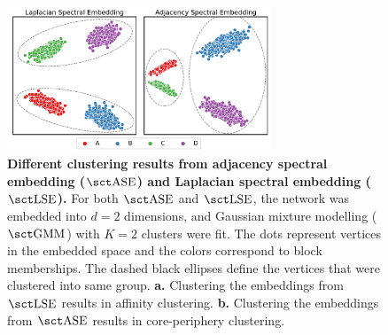 \begin{figure}
    \centering
    \includegraphics[width=0.7\textwidth]{figures/dnd/two_truths}
    \caption{\textbf{Different clustering results from adjacency spectral embedding ($\ase$) and Laplacian spectral embedding ($\lse$).} For both $\ase$ and $\lse$, the network was embedded into $d=2$ dimensions, and Gaussian mixture modelling ($\gmm$) with $K=2$ clusters were fit. The dots represent vertices in the embedded space and the colors correspond to block memberships. The dashed black ellipses define the vertices that were clustered into same group.
    \textbf{a.} Clustering the embeddings from $\lse$ results in affinity clustering. 
    \textbf{b.} Clustering the embeddings from $\ase$ results in core-periphery clustering.}
    \label{fig:exp8}
\end{figure}





